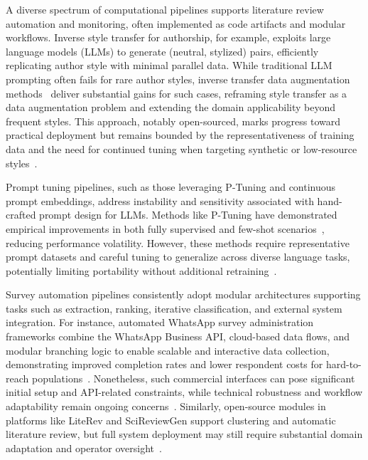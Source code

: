 \documentclass[sigconf]{acmart}
\begin{document}
A diverse spectrum of computational pipelines supports literature review automation and monitoring, often implemented as code artifacts and modular workflows. Inverse style transfer for authorship, for example, exploits large language models (LLMs) to generate (neutral, stylized) pairs, efficiently replicating author style with minimal parallel data. While traditional LLM prompting often fails for rare author styles, inverse transfer data augmentation methods~\cite{ref102} deliver substantial gains for such cases, reframing style transfer as a data augmentation problem and extending the domain applicability beyond frequent styles. This approach, notably open-sourced, marks progress toward practical deployment but remains bounded by the representativeness of training data and the need for continued tuning when targeting synthetic or low-resource styles~\cite{ref77}.

Prompt tuning pipelines, such as those leveraging P-Tuning and continuous prompt embeddings, address instability and sensitivity associated with hand-crafted prompt design for LLMs. Methods like P-Tuning have demonstrated empirical improvements in both fully supervised and few-shot scenarios~\cite{ref103}, reducing performance volatility. However, these methods require representative prompt datasets and careful tuning to generalize across diverse language tasks, potentially limiting portability without additional retraining~\cite{ref78}.

Survey automation pipelines consistently adopt modular architectures supporting tasks such as extraction, ranking, iterative classification, and external system integration. For instance, automated WhatsApp survey administration frameworks combine the WhatsApp Business API, cloud-based data flows, and modular branching logic to enable scalable and interactive data collection, demonstrating improved completion rates and lower respondent costs for hard-to-reach populations~\cite{ref117}. Nonetheless, such commercial interfaces can pose significant initial setup and API-related constraints, while technical robustness and workflow adaptability remain ongoing concerns~\cite{ref86}\cite{ref94}. Similarly, open-source modules in platforms like LiteRev and SciReviewGen support clustering and automatic literature review, but full system deployment may still require substantial domain adaptation and operator oversight~\cite{ref84}.
\end{document}

